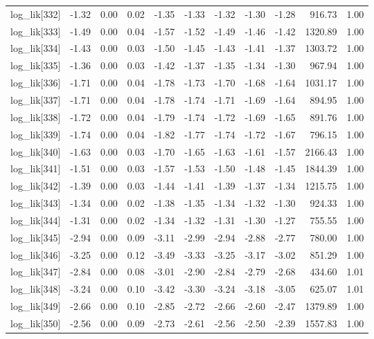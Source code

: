 \begin{table}[ht]
\begin{tabular}{rrrrrrrrrrr}
  log\_lik[332] & -1.32 & 0.00 & 0.02 & -1.35 & -1.33 & -1.32 & -1.30 & -1.28 & 916.73 & 1.00 \\ 
  log\_lik[333] & -1.49 & 0.00 & 0.04 & -1.57 & -1.52 & -1.49 & -1.46 & -1.42 & 1320.89 & 1.00 \\ 
  log\_lik[334] & -1.43 & 0.00 & 0.03 & -1.50 & -1.45 & -1.43 & -1.41 & -1.37 & 1303.72 & 1.00 \\ 
  log\_lik[335] & -1.36 & 0.00 & 0.03 & -1.42 & -1.37 & -1.35 & -1.34 & -1.30 & 967.94 & 1.00 \\ 
  log\_lik[336] & -1.71 & 0.00 & 0.04 & -1.78 & -1.73 & -1.70 & -1.68 & -1.64 & 1031.17 & 1.00 \\ 
  log\_lik[337] & -1.71 & 0.00 & 0.04 & -1.78 & -1.74 & -1.71 & -1.69 & -1.64 & 894.95 & 1.00 \\ 
  log\_lik[338] & -1.72 & 0.00 & 0.04 & -1.79 & -1.74 & -1.72 & -1.69 & -1.65 & 891.76 & 1.00 \\ 
  log\_lik[339] & -1.74 & 0.00 & 0.04 & -1.82 & -1.77 & -1.74 & -1.72 & -1.67 & 796.15 & 1.00 \\ 
  log\_lik[340] & -1.63 & 0.00 & 0.03 & -1.70 & -1.65 & -1.63 & -1.61 & -1.57 & 2166.43 & 1.00 \\ 
  log\_lik[341] & -1.51 & 0.00 & 0.03 & -1.57 & -1.53 & -1.50 & -1.48 & -1.45 & 1844.39 & 1.00 \\ 
  log\_lik[342] & -1.39 & 0.00 & 0.03 & -1.44 & -1.41 & -1.39 & -1.37 & -1.34 & 1215.75 & 1.00 \\ 
  log\_lik[343] & -1.34 & 0.00 & 0.02 & -1.38 & -1.35 & -1.34 & -1.32 & -1.30 & 924.33 & 1.00 \\ 
  log\_lik[344] & -1.31 & 0.00 & 0.02 & -1.34 & -1.32 & -1.31 & -1.30 & -1.27 & 755.55 & 1.00 \\ 
  log\_lik[345] & -2.94 & 0.00 & 0.09 & -3.11 & -2.99 & -2.94 & -2.88 & -2.77 & 780.00 & 1.00 \\ 
  log\_lik[346] & -3.25 & 0.00 & 0.12 & -3.49 & -3.33 & -3.25 & -3.17 & -3.02 & 851.29 & 1.00 \\ 
  log\_lik[347] & -2.84 & 0.00 & 0.08 & -3.01 & -2.90 & -2.84 & -2.79 & -2.68 & 434.60 & 1.01 \\ 
  log\_lik[348] & -3.24 & 0.00 & 0.10 & -3.42 & -3.30 & -3.24 & -3.18 & -3.05 & 625.07 & 1.01 \\ 
  log\_lik[349] & -2.66 & 0.00 & 0.10 & -2.85 & -2.72 & -2.66 & -2.60 & -2.47 & 1379.89 & 1.00 \\ 
  log\_lik[350] & -2.56 & 0.00 & 0.09 & -2.73 & -2.61 & -2.56 & -2.50 & -2.39 & 1557.83 & 1.00 \\ 

\end{tabular}
\end{table}
